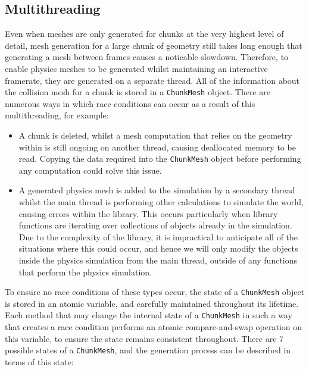 \documentclass{article}
\begin{document}
\subsection{Multithreading}
Even when meshes are only generated for chunks at the very highest level of detail, mesh generation for a large chunk of geometry still takes long enough that generating a mesh between frames causes a noticable slowdown. Therefore, to enable physics meshes to be generated whilst maintaining an interactive framerate, they are generated on a separate thread. All of the information about the collision mesh for a chunk is stored in a \texttt{ChunkMesh} object. There are numerous ways in which race conditions can occur as a result of this multithreading, for example:
\begin{itemize}
  \item A chunk is deleted, whilst a mesh computation that relies on the geometry within is still ongoing on another thread, causing deallocated memory to be read. Copying the data required into the \texttt{ChunkMesh} object before performing any computation could solve this issue.
  \item A generated physics mesh is added to the simulation by a secondary thread whilst the main thread is performing other calculations to simulate the world, causing errors within the library. This occurs particularly when library functions are iterating over collections of objects already in the simulation. Due to the complexity of the library, it is impractical to anticipate all of the situations where this could occur, and hence we will only modify the objects inside the physics simulation from the main thread, outside of any functions that perform the physics simulation.
\end{itemize}
To ensure no race conditions of these types occur, the state of a \texttt{ChunkMesh} object is stored in an atomic variable, and carefully maintained throughout its lifetime. Each method that may change the internal state of a \texttt{ChunkMesh} in such a way that creates a race condition performs an atomic compare-and-swap operation on this variable, to ensure the state remains consistent throughout. There are 7 possible states of a \texttt{ChunkMesh}, and the generation process can be described in terms of this state:
\end{document}

